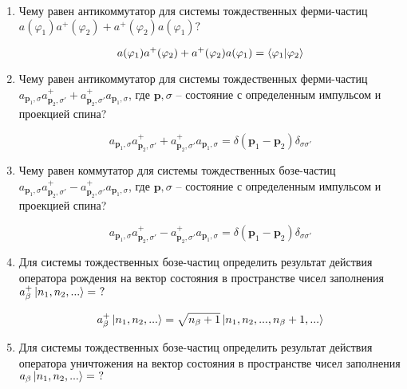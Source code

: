 \documentclass{article}
\begin{document}
\begin{enumerate}
	\item {Чему равен антикоммутатор для системы тождественных ферми-частиц \\$a(\varphi_1)a^+(\varphi_2) + a^+(\varphi_2)a(\varphi_1)?$}
	
	\begin{equation}
		a(\varphi_1)a^+(\varphi_2) + a^+(\varphi_2)a(\varphi_1) = \braket{\varphi_1|\varphi_2}
	\end{equation}
	
	\item {Чему равен антикоммутатор для системы тождественных ферми-частиц \\ $a_{\textbf{p}_1,\sigma} a^+_{\textbf{p}_2,\sigma'} + a^+_{\textbf{p}_2,\sigma'}a_{\textbf{p}_1,\sigma}$, где ${\textbf{p},\sigma}$ – состояние с определенным импульсом и проекцией спина?}
	
	\begin{equation}
		a_{\textbf{p}_1,\sigma} a^+_{\textbf{p}_2,\sigma'} + a^+_{\textbf{p}_2,\sigma'}a_{\textbf{p}_1,\sigma} = \delta(\textbf{p}_1 - \textbf{p}_2)\delta_{\sigma\sigma'}
	\end{equation}
	
	\item {Чему равен коммутатор для системы тождественных бозе-частиц \\ $a_{\textbf{p}_1,\sigma} a^+_{\textbf{p}_2,\sigma'} - a^+_{\textbf{p}_2,\sigma'}a_{\textbf{p}_1,\sigma}$, где ${\textbf{p},\sigma}$ – состояние с определенным импульсом и проекцией спина?}
	
	\begin{equation}
		a_{\textbf{p}_1,\sigma} a^+_{\textbf{p}_2,\sigma'} - a^+_{\textbf{p}_2,\sigma'}a_{\textbf{p}_1,\sigma} = \delta(\textbf{p}_1 - \textbf{p}_2)\delta_{\sigma\sigma'}
	\end{equation}
	
	\item {Для системы тождественных бозе-частиц определить результат действия оператора рождения на вектор состояния в пространстве чисел заполнения $a^+_\beta \ket{n_1, n_2, ...} = \ ?$}
	
	\begin{equation}
		a^+_\beta \ket{n_1, n_2, ...} = \sqrt{n_\beta + 1} \ket{n_1, n_2, ..., n_\beta +1,...}
	\end{equation}
	
	\item {Для системы тождественных бозе-частиц определить результат действия оператора уничтожения на вектор состояния в пространстве чисел заполнения $a_\beta \ket{n_1, n_2, ...} = \ ?$}
	

\end{enumerate}
\end{document}
